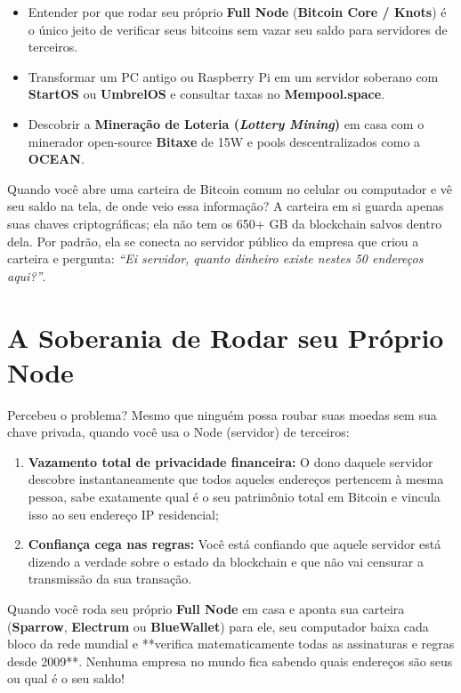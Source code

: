\documentclass{pousadaguide}
\begin{document}
\begin{missao}
\begin{itemize}
  \item Entender por que rodar seu próprio \textbf{Full Node} (\textbf{Bitcoin Core / Knots}) é o único jeito de verificar seus bitcoins sem vazar seu saldo para servidores de terceiros.
  \item Transformar um PC antigo ou Raspberry Pi em um servidor soberano com \textbf{StartOS} ou \textbf{UmbrelOS} e consultar taxas no \textbf{Mempool.space}.
  \item Descobrir a \textbf{Mineração de Loteria (\emph{Lottery Mining})} em casa com o minerador open-source \textbf{Bitaxe} de 15W e pools descentralizados como a \textbf{OCEAN}.
\end{itemize}
\end{missao}

Quando você abre uma carteira de Bitcoin comum no celular ou computador e vê seu saldo na tela, de onde veio essa informação? A carteira em si guarda apenas suas chaves criptográficas; ela não tem os 650+ GB da blockchain salvos dentro dela. Por padrão, ela se conecta ao servidor público da empresa que criou a carteira e pergunta: \emph{``Ei servidor, quanto dinheiro existe nestes 50 endereços aqui?''}.

\section{A Soberania de Rodar seu Próprio Node}

Percebeu o problema? Mesmo que ninguém possa roubar suas moedas sem sua chave privada, quando você usa o Node (servidor) de terceiros:
\begin{enumerate}
  \item \textbf{Vazamento total de privacidade financeira:} O dono daquele servidor descobre instantaneamente que todos aqueles endereços pertencem à mesma pessoa, sabe exatamente qual é o seu patrimônio total em Bitcoin e vincula isso ao seu endereço IP residencial;
  \item \textbf{Confiança cega nas regras:} Você está confiando que aquele servidor está dizendo a verdade sobre o estado da blockchain e que não vai censurar a transmissão da sua transação.
\end{enumerate}

Quando você roda seu próprio \textbf{Full Node} em casa e aponta sua carteira (\textbf{Sparrow}, \textbf{Electrum} ou \textbf{BlueWallet}) para ele, seu computador baixa cada bloco da rede mundial e **verifica matematicamente todas as assinaturas e regras desde 2009**. Nenhuma empresa no mundo fica sabendo quais endereços são seus ou qual é o seu saldo!
\end{document}
